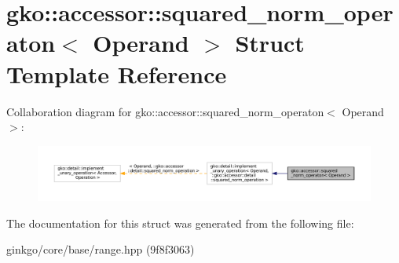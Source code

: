 \hypertarget{structgko_1_1accessor_1_1squared__norm__operaton}{}\section{gko\+:\+:accessor\+:\+:squared\+\_\+norm\+\_\+operaton$<$ Operand $>$ Struct Template Reference}
\label{structgko_1_1accessor_1_1squared__norm__operaton}


Collaboration diagram for gko\+:\+:accessor\+:\+:squared\+\_\+norm\+\_\+operaton$<$ Operand $>$\+:
\nopagebreak
\begin{figure}[H]
\begin{center}
\leavevmode
\includegraphics[width=350pt]{structgko_1_1accessor_1_1squared__norm__operaton__coll__graph}
\end{center}
\end{figure}


The documentation for this struct was generated from the following file\+:\begin{DoxyCompactItemize}
\item 
ginkgo/core/base/range.\+hpp (9f8f3063)\end{DoxyCompactItemize}
